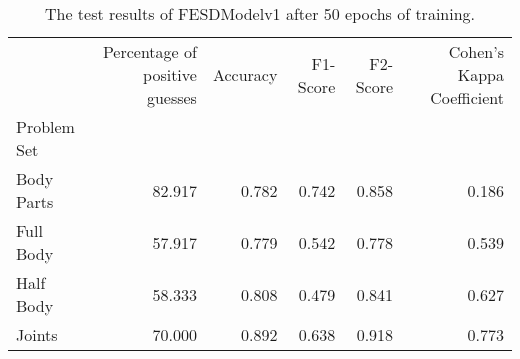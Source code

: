 \begin{table}
      \caption[]{}
      \label{}
          \begin{table}[!htbp]
        \caption[Test Results of FESDModelv1]{The test results of FESDModelv1 after 50 epochs of training.}
        \label{tab:res_v1}
        \begin{tabular}{lrrrrr}
\hline
{} &  Percentage of positive guesses &  Accuracy &  F1-Score &  F2-Score &  Cohen's Kappa Coefficient \\
Problem Set   &                                 &           &           &           &                            \\
\hline
Body Parts &                          82.917 &     0.782 &     0.742 &     0.858 &                      0.186 \\
Full Body  &                          57.917 &     0.779 &     0.542 &     0.778 &                      0.539 \\
Half Body  &                          58.333 &     0.808 &     0.479 &     0.841 &                      0.627 \\
Joints     &                          70.000 &     0.892 &     0.638 &     0.918 &                      0.773 \\
\hline
\end{tabular}

    \end{table}
  \end{table}